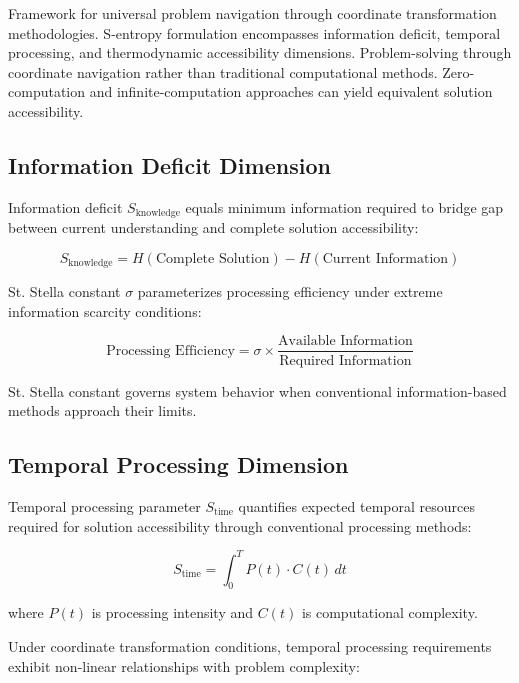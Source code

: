 \documentclass[12pt,a4paper]{article}
\begin{document}
Framework for universal problem navigation through coordinate transformation methodologies. S-entropy formulation encompasses information deficit, temporal processing, and thermodynamic accessibility dimensions. Problem-solving through coordinate navigation rather than traditional computational methods. Zero-computation and infinite-computation approaches can yield equivalent solution accessibility.

\subsection{Information Deficit Dimension}

Information deficit $S_{\text{knowledge}}$ equals minimum information required to bridge gap between current understanding and complete solution accessibility:

\begin{equation}
S_{\text{knowledge}} = H(\text{Complete Solution}) - H(\text{Current Information})
\end{equation}

St. Stella constant $\sigma$ parameterizes processing efficiency under extreme information scarcity conditions:

\begin{equation}
\text{Processing Efficiency} = \sigma \times \frac{\text{Available Information}}{\text{Required Information}}
\end{equation}

St. Stella constant governs system behavior when conventional information-based methods approach their limits.

\subsection{Temporal Processing Dimension}

Temporal processing parameter $S_{\text{time}}$ quantifies expected temporal resources required for solution accessibility through conventional processing methods:

\begin{equation}
S_{\text{time}} = \int_0^T P(t) \cdot C(t) \, dt
\end{equation}

where $P(t)$ is processing intensity and $C(t)$ is computational complexity.

Under coordinate transformation conditions, temporal processing requirements exhibit non-linear relationships with problem complexity:
\end{document}
